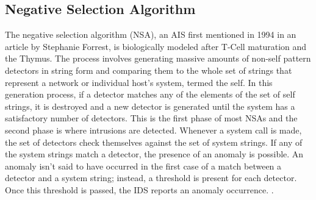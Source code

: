 \documentclass{umm-senior-sem}
\begin{document}
\subsection{Negative Selection Algorithm}
The negative selection algorithm (NSA), an AIS first mentioned in 1994 in an article by Stephanie Forrest, is biologically modeled after T-Cell maturation and the Thymus. The process involves generating massive amounts of non-self pattern detectors in string form and comparing them to the whole set of strings that represent a network or individual host's system, termed the self. In this generation process, if a detector matches any of the elements of the set of self strings, it is destroyed and a new detector is generated until the system has a satisfactory number of detectors.
This is the first phase of most NSAs and the second phase is where intrusions are detected. Whenever a system call is made, the set of detectors check themselves against the set of system strings. If any of the system strings match a detector, the presence of an anomaly is possible. 
An anomaly isn't said to have occurred in the first case of a match between a detector and a system string; instead, a threshold is present for each detector. Once this threshold is passed, the IDS reports an anomaly occurrence. 
\cite{revisitingNSA:2007}.
\end{document}
